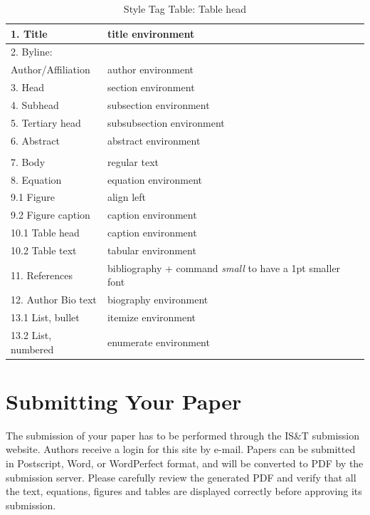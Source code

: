 \documentclass[letterpaper,twocolumn,fleqn]{article}
\begin{document}
\begin{table}[!h]
\caption{Style Tag Table: Table head}
\label{tab:fonts}
\begin{center}       
\begin{tabular}{|p{}|p{}|} 
\hline
1. Title& title environment \\ \hline
2. Byline: & \\
Author/Affiliation & author environment \\ \hline
3. Head & section environment \\ \hline
4. Subhead & subsection environment \\ \hline
5. Tertiary head & subsubsection environment \\ \hline
6. Abstract & abstract environment \\ \hline 
& \\ \hline
7. Body & regular text\\ \hline
8. Equation & equation environment\\ \hline
9.1 Figure & align left \\ \hline
9.2 Figure caption & caption environment \\ \hline
10.1 Table head & caption environment \\ \hline
10.2 Table text & tabular environment \\ \hline
11. References & bibliography + 
command \emph{small} to have a 1pt smaller font\\ \hline
12. Author Bio text & biography environment\\ \hline
13.1 List, bullet & itemize environment\\ \hline
13.2 List, numbered & enumerate environment \\ \hline
\end{tabular}
\end{center}
\end{table} 


\section{Submitting Your Paper}
The submission of your paper has to be performed through the IS\&T
submission website. Authors receive a login for this site by e-mail.
Papers can be submitted in Postscript, Word, or WordPerfect format,
and will be converted to PDF by the submission server. Please
carefully review the generated PDF and verify that all the text,
equations, figures and tables are displayed correctly before approving
its submission.
\end{document}
